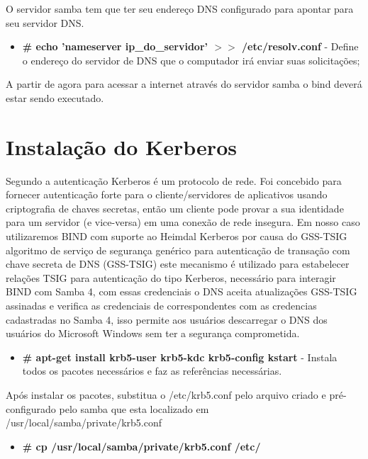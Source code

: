 O servidor samba tem que ter seu endereço DNS configurado para apontar para seu servidor DNS.

\begin{itemize}
	\item \textbf{\# echo 'nameserver ip\_do\_servidor' $>$$>$ /etc/resolv.conf} - Define o endereço do servidor de DNS que o computador irá enviar suas solicitações;
\end{itemize}

A partir de agora para acessar a internet através do servidor samba o bind deverá estar sendo executado.

\section{Instalação do Kerberos}

Segundo \cite{HEIMDAL} a autenticação Kerberos é um protocolo de rede. Foi concebido para fornecer autenticação forte para o cliente/servidores de aplicativos usando criptografia de chaves secretas, então um cliente pode provar a sua identidade para um servidor (e vice-versa) em uma conexão de rede insegura.
Em nosso caso utilizaremos BIND com suporte ao Heimdal Kerberos por causa do GSS-TSIG algoritmo de serviço de segurança genérico para autenticação de transação com chave secreta de DNS (GSS-TSIG) este mecanismo é utilizado para estabelecer relações TSIG para autenticação do tipo Kerberos, necessário para interagir BIND com Samba 4, com essas credenciais o DNS aceita atualizações GSS-TSIG assinadas e verifica as credenciais de correspondentes com as credencias cadastradas no Samba 4, isso permite aos usuários descarregar o DNS dos usuários do Microsoft Windows sem ter a segurança comprometida.

\begin{itemize}
	\item \textbf{\# apt-get install krb5-user krb5-kdc krb5-config kstart} - Instala todos os pacotes necessários e faz as referências necessárias.
\end{itemize}

Após instalar os pacotes, substitua o /etc/krb5.conf pelo arquivo criado e pré-configurado pelo samba que esta localizado em /usr/local/samba/private/krb5.conf

\begin{itemize}
	\item \textbf{\# cp /usr/local/samba/private/krb5.conf  /etc/}
\end{itemize}

